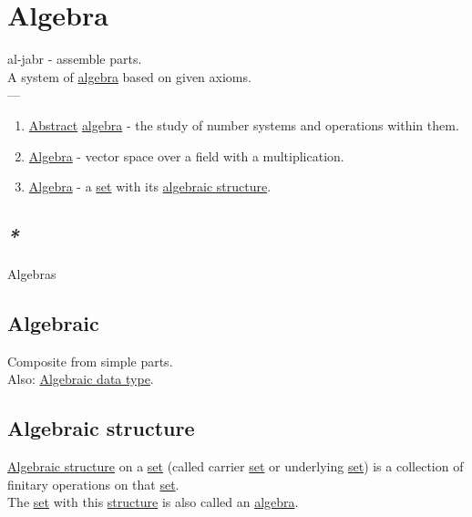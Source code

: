 \documentclass[a4paper,14pt,oneside]{book}
\begin{document}
\chapter{\label{orgd3760ff}Algebra}
\label{sec:org5445ce8}
al-jabr - assemble parts.\\
A system of \hyperref[orgd3760ff]{algebra} based on given axioms.\\

---\\

\begin{enumerate}
\item \hyperref[org321fc4b]{Abstract} \hyperref[orgd3760ff]{algebra} - the study of number systems and operations within them.\\
\item \hyperref[orgd3760ff]{Algebra} - vector space over a field with a multiplication.\\
\item \hyperref[orgd3760ff]{Algebra} - a \hyperref[orge119629]{set} with its \hyperref[org3279da7]{algebraic structure}.\\
\end{enumerate}

\section{\emph{*}}
\label{sec:orgf7c15fc}

\label{org44272d3}Algebras\\

\section{\label{orga42386a}Algebraic}
\label{sec:orgd72de45}
Composite from simple parts.\\
Also: \hyperref[org05a048b]{Algebraic data type}.\\

\section{\label{org3279da7}Algebraic structure}
\label{sec:org0649209}
\hyperref[org3279da7]{Algebraic structure} on a \hyperref[orge119629]{set} (called carrier \hyperref[orge119629]{set} or underlying \hyperref[orge119629]{set}) is a collection of finitary operations on that \hyperref[orge119629]{set}.\\
The \hyperref[orge119629]{set} with this \hyperref[orgc940043]{structure} is also called an \hyperref[orgd3760ff]{algebra}.\\
\end{document}
